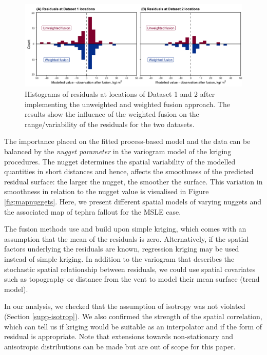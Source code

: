 \documentclass[a4paper,fleqn]{cas-sc}
\begin{document}
    \begin{figure}[htbp!]
    \centering
    \includegraphics[width=\linewidth]{Figures/fig8_histograms-kriging.png}
    \caption{Histograms of residuals at locations of Dataset 1 and 2 after implementing the unweighted and weighted fusion approach. The results show the influence of the weighted fusion on the range/variability of the residuals for the two datasets.}
    \label{fig:histkrig}
    \end{figure}

The importance placed on the fitted process-based model and the data can be balanced by the \textit{nugget parameter} in the variogram model of the kriging procedures. The nugget determines the spatial variability of the modelled quantities in short distances and hence, affects the smoothness of the predicted residual surface: the larger the nugget, the smoother the surface. This variation in smoothness in relation to the nugget value is visualised in Figure \ref{fig:mapnuggets}. Here, we present different spatial models of varying nuggets and the associated map of tephra fallout for the MSLE case. 

The fusion methods use and build upon simple kriging, which comes with an assumption that the mean of the residuals is zero. Alternatively, if the spatial factors underlying the residuals are known, regression kriging may be used instead of simple kriging. In addition to the variogram that describes the stochastic spatial relationship between residuals, we could use spatial covariates such as topography or distance from the vent to model their mean surface (trend model).

In our analysis, we checked that the assumption of isotropy was not violated (Section \ref{supp-isotrop}). We also confirmed the strength of the spatial correlation, which can tell us if kriging would be suitable as an interpolator and if the form of residual is appropriate. Note that extensions towards non-stationary and anisotropic distributions can be made but are out of scope for this paper.
\end{document}
